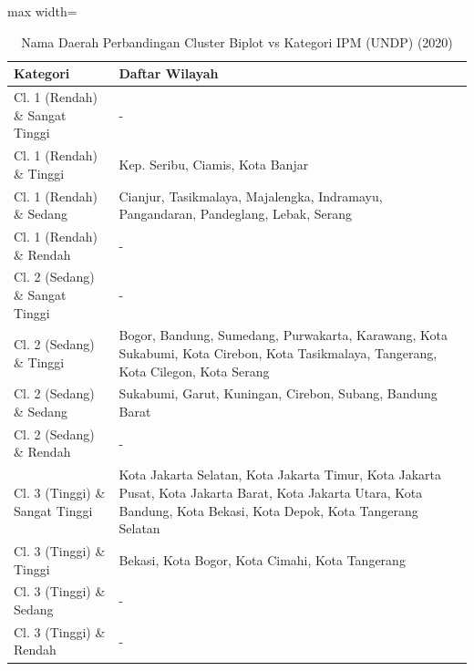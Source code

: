 \begin{table}[H]
\centering
\caption{Nama Daerah Perbandingan Cluster Biplot vs Kategori IPM (UNDP) (2020)} \label{tab:appcrossname2020}
\begin{adjustbox}{max width=\textwidth}
\begin{tabular}{|p{4cm}|p{10cm}|}
\hline
\textbf{Kategori} & \textbf{Daftar Wilayah} \\
\hline
Cl. 1 (Rendah) \& Sangat Tinggi & - \\
\hline
Cl. 1 (Rendah) \& Tinggi & Kep. Seribu, Ciamis, Kota Banjar \\
\hline
Cl. 1 (Rendah) \& Sedang & Cianjur, Tasikmalaya, Majalengka, Indramayu, Pangandaran, Pandeglang, Lebak, Serang \\
\hline
Cl. 1 (Rendah) \& Rendah & - \\
\hline
Cl. 2 (Sedang) \& Sangat Tinggi & - \\
\hline
Cl. 2 (Sedang) \& Tinggi & Bogor, Bandung, Sumedang, Purwakarta, Karawang, Kota Sukabumi, Kota Cirebon, Kota Tasikmalaya, Tangerang, Kota Cilegon, Kota Serang \\
\hline
Cl. 2 (Sedang) \& Sedang & Sukabumi, Garut, Kuningan, Cirebon, Subang, Bandung Barat \\
\hline
Cl. 2 (Sedang) \& Rendah & - \\
\hline
Cl. 3 (Tinggi) \& Sangat Tinggi & Kota Jakarta Selatan, Kota Jakarta Timur, Kota Jakarta Pusat, Kota Jakarta Barat, Kota Jakarta Utara, Kota Bandung, Kota Bekasi, Kota Depok, Kota Tangerang Selatan \\
\hline
Cl. 3 (Tinggi) \& Tinggi & Bekasi, Kota Bogor, Kota Cimahi, Kota Tangerang \\
\hline
Cl. 3 (Tinggi) \& Sedang & - \\
\hline
Cl. 3 (Tinggi) \& Rendah & - \\
\hline
\end{tabular}
\end{adjustbox}
\end{table}